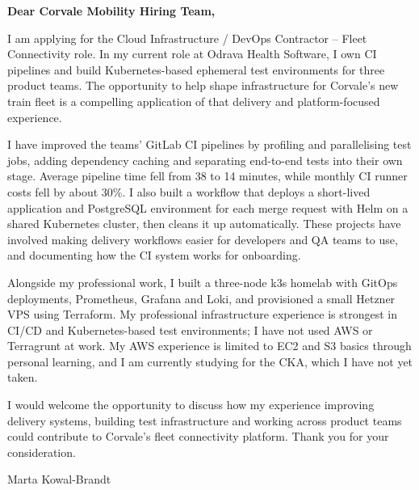 \documentclass[11pt,a4paper]{article}
\begin{document}
\color{primarycolor}
\textbf{Dear Corvale Mobility Hiring Team,}

I am applying for the Cloud Infrastructure / DevOps Contractor -- Fleet Connectivity role. In my current role at Odrava Health Software, I own CI pipelines and build Kubernetes-based ephemeral test environments for three product teams. The opportunity to help shape infrastructure for Corvale's new train fleet is a compelling application of that delivery and platform-focused experience.

I have improved the teams' GitLab CI pipelines by profiling and parallelising test jobs, adding dependency caching and separating end-to-end tests into their own stage. Average pipeline time fell from 38 to 14 minutes, while monthly CI runner costs fell by about 30\%. I also built a workflow that deploys a short-lived application and PostgreSQL environment for each merge request with Helm on a shared Kubernetes cluster, then cleans it up automatically. These projects have involved making delivery workflows easier for developers and QA teams to use, and documenting how the CI system works for onboarding.

Alongside my professional work, I built a three-node k3s homelab with GitOps deployments, Prometheus, Grafana and Loki, and provisioned a small Hetzner VPS using Terraform. My professional infrastructure experience is strongest in CI/CD and Kubernetes-based test environments; I have not used AWS or Terragrunt at work. My AWS experience is limited to EC2 and S3 basics through personal learning, and I am currently studying for the CKA, which I have not yet taken.

I would welcome the opportunity to discuss how my experience improving delivery systems, building test infrastructure and working across product teams could contribute to Corvale's fleet connectivity platform. Thank you for your consideration.

Marta Kowal-Brandt
\end{document}
